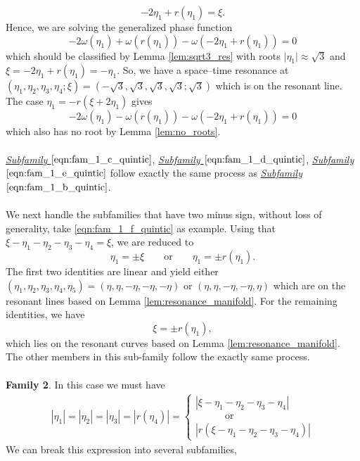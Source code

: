 \documentclass[reqno,english,11pt]{amsart}
\theoremstyle{definition}
\numberwithin{equation}{section}
\begin{document}
$$-2\eta_1+r(\eta_1)=\xi.$$
Hence, we are solving the generalized phase function
$$-2\omega(\eta_1)+\omega(r(\eta_1))-\omega(-2\eta_1+r(\eta_1))=0$$
which should be classified by  Lemma \ref{lem:sqrt3_res} with roots $\vert \eta_1\vert \approx \sqrt{3}$ and $\xi=-2\eta_1+r(\eta_1)=-\eta_1$. So, we have a space--time resonance at $(\eta_1,\eta_2,\eta_3,\eta_4; \xi)=(-\sqrt{3},\sqrt{3},\sqrt{3},\sqrt{3};\sqrt{3})$ which is on the resonant line. The case $\eta_1=-r(\xi+2\eta_1)$ gives
$$-2\omega(\eta_1)-\omega(r(\eta_1))-\omega(-2\eta_1+r(\eta_1))=0$$
which also has no root by Lemma \ref{lem:no_roots}.
\\\\
\noindent
{\it \underline{Subfamily $\eqref{eqn:fam_1_c_quintic}$}}, {\it \underline{Subfamily $\eqref{eqn:fam_1_d_quintic}$}}, {\it \underline{Subfamily $\eqref{eqn:fam_1_e_quintic}$}} follow exactly the same process as {\it \underline{Subfamily $\eqref{eqn:fam_1_b_quintic}$}}.
\\\\
We next handle the subfamilies that have two minus sign, without loss of generality, take \eqref{eqn:fam_1_f_quintic} as example. Using that $\xi-\eta_1-\eta_2-\eta_3-\eta_4=\xi$, we are reduced to
$$\eta_1=\pm \xi\qquad \text{or}\qquad \eta_1=\pm r(\eta_1).$$
The first two identities are linear and yield either $(\eta_1,\eta_2,\eta_3,\eta_4,\eta_5)=(\eta,\eta,-\eta,-\eta,-\eta)\text{ or }(\eta,\eta,-\eta,-\eta,\eta)$ which are on the resonant lines based on Lemma \ref{lem:resonance_manifold}. For the remaining identities, we have 
$$\xi=\pm r(\eta_1),$$
which lies on the resonant curves based on Lemma \ref{lem:resonance_manifold}. The other members in this sub-family follow the exactly same process.\\\\
\noindent
\textbf{Family 2}.  In this case we must have 
 \begin{align}
 |\eta_{1}|=|\eta_{2}|=|\eta_3|=|r(\eta_4)| =\begin{cases} 
  |\xi-\eta_{1}-\eta_{2}-\eta_{3}-\eta_4| 
  \\
   \quad\quad\quad \text{or}
  \\
\left|r\left(\xi-\eta_{1}-\eta_{2}-\eta_{3}-\eta_4\right)\right|
 \end{cases}
 \label{eqn:fam_2_main_eqn}
 \end{align}
 We can break this expression into several subfamilies,
\end{document}
